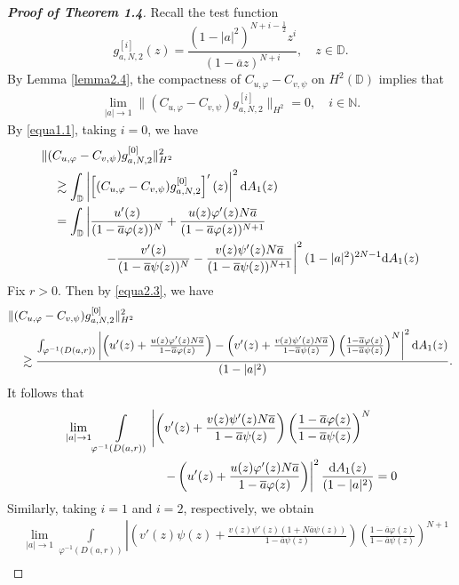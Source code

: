 \documentclass[preprint,12pt,times]{elsarticle}
\theoremstyle{definition}
\theoremstyle{remark}
\numberwithin{equation}{section}
\begin{document}
\begin{proof}[{\bf Proof of Theorem 1.4}]
Recall the test function 
$$g_{a,N,2}^{[i]}(z)=\frac{(1-|a|^2)^{N+i-\frac{1}{2}}z^i}{(1-\overline{a}z)^{N+i}},\quad z\in\mathbb{D}.$$
By Lemma \ref{lemma2.4}, the compactness of $C_{u,\varphi}-C_{v,\psi}$ on $H^2(\mathbb{D})$ implies that
\begin{align*}
\lim_{|a|\to 1}\|(C_{u,\varphi}-C_{v,\psi})g_{a,N,2}^{[i]}\|_{H^2}=0,\quad i\in\mathbb{N}.
\end{align*}
By \eqref{equa1.1}, taking $i=0$, we have
\begin{align*}
&\|(C_{u,\varphi}-C_{v,\psi})g_{a,N,2}^{[0]}\|_{H^2}^2\\
&\quad \gtrsim \int_{\mathbb{D}}\left|\left[(C_{u,\varphi}-C_{v,\psi})g_{a,N,2}^{[0]}\right]'(z)\right|^2{\rm d}A_1(z)\\
&\quad =\int_{\mathbb{D}}\left|\frac{u'(z)}{(1-\overline{a}\varphi(z))^{N}}+\frac{u(z)\varphi'(z)N\overline{a}}{(1-\overline{a}\varphi(z))^{N+1}}\right.\\
&\quad\qquad\qquad \left.-\frac{v'(z)}{(1-\overline{a}\psi(z))^{N}}-\frac{v(z)\psi'(z)N\overline{a}}{(1-\overline{a}\psi(z))^{N+1}}\right|^2(1-|a|^2)^{2N-1}{\rm d}A_{1}(z)
\end{align*}
Fix $r>0$. Then by \eqref{equa2.3}, we have
\begin{align*}
&\|(C_{u,\varphi}-C_{v,\psi})g_{a,N,2}^{[0]}\|_{H^2}^2\\
&\quad \gtrsim\frac{\int_{\varphi^{-1}(D(a,r))}\left|\left(u'(z)+\frac{u(z)\varphi'(z)N\overline{a}}{1-\overline{a}\varphi(z)}\right)-\left(v'(z)+\frac{v(z)\psi'(z)N\overline{a}}{1-\overline{a}\psi(z)}\right)\left(\frac{1-\overline{a}\varphi(z)}{1-\overline{a}\psi(z)}\right)^N\right|^2{\rm d}A_1(z)}{(1-|a|^2)}.
\end{align*}
It follows that
\begin{align}\label{equa5.6}
&\lim_{|a|\to 1}\int\limits_{\varphi^{-1}(D(a,r))}\left|\left(v'(z)+\frac{v(z)\psi'(z)N\overline{a}}{1-\overline{a}\psi(z)}\right)\left(\frac{1-\overline{a}\varphi(z)}{1-\overline{a}\psi(z)}\right)^N\right.\nonumber \\
&\qquad\qquad\qquad\qquad\left.-\left(u'(z)+\frac{u(z)\varphi'(z)N\overline{a}}{1-\overline{a}\varphi(z)}\right)\right|^2\frac{{\rm d}A_1(z)}{(1-|a|^2)}=0
\end{align}
Similarly, taking $i=1$ and $i=2$, respectively, we obtain
\begin{align}\label{equa5.7}
&\lim_{|a|\to 1}\int\limits_{\varphi^{-1}(D(a,r))}\left|\left(v'(z)\psi(z)+\frac{v(z)\psi'(z)(1+N\overline{a}\psi(z))}{1-\overline{a}\psi(z)}\right)\left(\frac{1-\overline{a}\varphi(z)}{1-\overline{a}\psi(z)}\right)^{N+1}\right.\nonumber\\

\end{align}
\end{proof}
\end{document}
